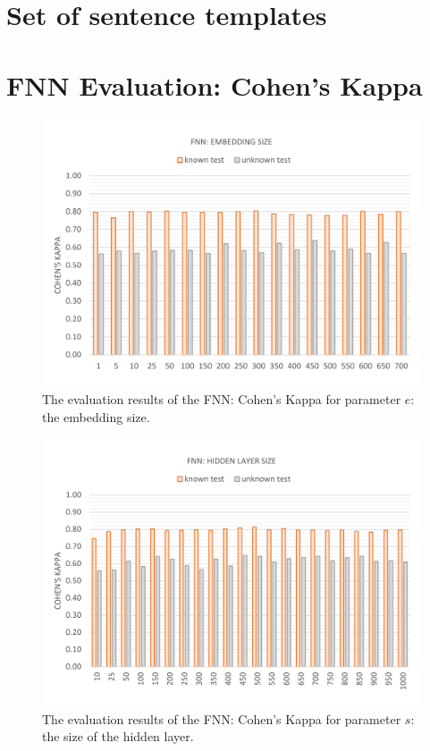 \section{Set of sentence templates}\label{c.appendix.sentencetemplates}


\newpage

\section{FNN Evaluation: Cohen's Kappa}\label{c.appendix.kappa.fnn}
\vspace{-13mm}
\begin{figure}[H]
	\centering\includegraphics[width=\textwidth]{images/evaluation_fnn_e_k}
	\caption[FNN Evaluation: Number of Past Words]{The evaluation results of the FNN: Cohen's Kappa for parameter $e$: the embedding size.}
	\label{f.evaluation.fnn.e.k}
\end{figure}

\vspace{-13mm}
\begin{figure}[H]
	\centering\includegraphics[width=\textwidth]{images/evaluation_fnn_s_k}
	\caption[FNN Evaluation: Hidden Layer Size]{The evaluation results of the FNN: Cohen's Kappa for parameter $s$: the size of the hidden layer.}
	\label{f.evaluation.fnn.s.k}
\end{figure}


